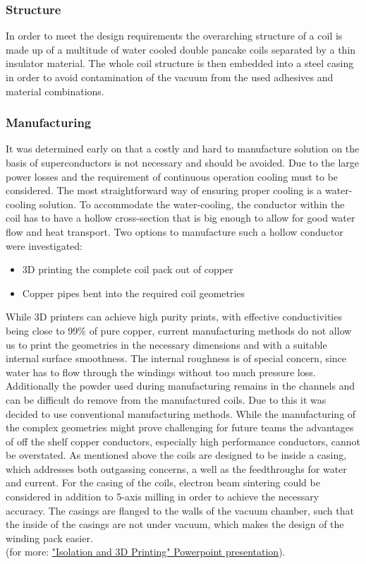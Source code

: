\subsubsection{Structure}
In order to meet the design requirements the overarching structure of a coil is made up of a multitude of water cooled double pancake coils separated by a thin insulator material.
The whole coil structure is then embedded into a steel casing in order to avoid contamination of the vacuum from the used adhesives and material combinations.

\subsubsection{Manufacturing}
It was determined early on that a costly and hard to manufacture solution on the basis of superconductors is not necessary and should be avoided.
Due to the large power losses and the requirement of continuous operation cooling must to be considered.
The most straightforward way of ensuring proper cooling is a water-cooling solution.
To accommodate the water-cooling, the conductor within the coil has to have a hollow cross-section that is big enough to allow for good water flow and heat transport.
Two options to manufacture such a hollow conductor were investigated:
\begin{itemize}
    \item 3D printing the complete coil pack out of copper
    \item Copper pipes bent into the required coil geometries
\end{itemize}
While 3D printers can achieve high purity prints, with effective conductivities being close to 99\% of pure copper, current manufacturing methods do not allow us to print the geometries in the necessary dimensions and with a suitable internal surface smoothness.
The internal roughness is of special concern, since water has to flow through the windings without too much pressure loss.
Additionally the powder used during manufacturing remains in the channels and can be difficult do remove from the manufactured coils.
Due to this it was decided to use conventional manufacturing methods.
While the manufacturing of the complex geometries might prove challenging for future teams the advantages of off the shelf copper conductors, especially high performance conductors, cannot be overstated.
As mentioned above the coils are designed to be inside a casing, which addresses both outgassing concerns, a well as the feedthroughs for water and current.
For the casing of the coils, electron beam sintering could be considered in addition to 5-axis milling in order to achieve the necessary accuracy.
The casings are flanged to the walls of the vacuum chamber, such that the inside of the casings are not under vacuum, which makes the design of the winding pack easier.\\
(for more: \href{https://cloud.tugraz.at/index.php/apps/onlyoffice/s/XBeMB6XiRDt3L2p?fileId=1032740140}{"Isolation and 3D Printing" Powerpoint presentation}).

